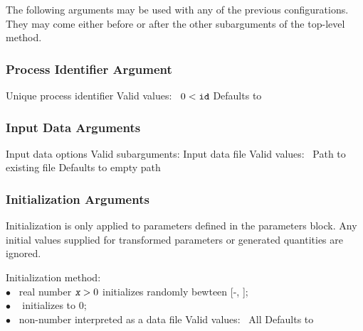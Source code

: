 The following arguments may be used with any of the previous
configurations.   They may come either before or after the other
subarguments of the top-level method.

\subsubsection{Process Identifier Argument}

\begin{description}
  {Unique process identifier}
  {Valid values: \  $0 < \mbox{\code{id}}$}
  {Defaults to }
%
\end{description}

\subsubsection{Input Data Arguments}

\begin{description}

  {Input data options}
  {Valid subarguments: }
%
    {Input data file}
    {Valid values: \  Path to existing file}
    {Defaults to empty path}
%
\end{description}

\subsubsection{Initialization Arguments}

Initialization is only applied to parameters defined in the parameters
block.  Any initial values supplied for transformed parameters or
generated quantities are ignored. 

\begin{description}
  {Initialization method: \\
        \hspace*{8pt} $\bullet$ \ real number $\mbox{\farg{x}} > 0$ initializes randomly bewteen [-,
        ]; 
        \\
        \hspace*{8pt} $\bullet$ \   initializes to 0; 
        \\
        \hspace*{8pt} $\bullet$ \  non-number interpreted as a data file}
  {Valid values: \  All}
  {Defaults to }
%
\end{description}


